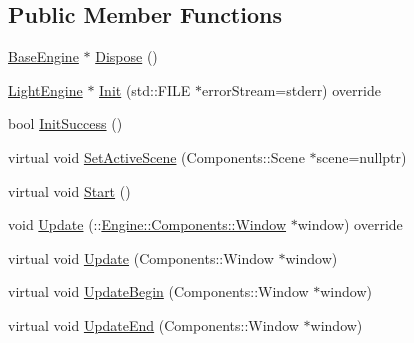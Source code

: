 \subsection*{Public Member Functions}
\begin{DoxyCompactItemize}
\item 
\mbox{\hyperlink{classEngine_1_1BaseEngine_ad838c97afe1790cb35527f0b58e81e6b}{Base\+Engine}} $\ast$ \mbox{\hyperlink{classEngine_1_1BaseEngine_acd5cd5d2189d24e038b23477b7dce405}{Dispose}} ()
\item 
\mbox{\hyperlink{classApplication_1_1Engines_1_1LightEngine}{Light\+Engine}} $\ast$ \mbox{\hyperlink{classApplication_1_1Engines_1_1LightEngine_ad992d8a300f099c247d7ba8dc38883ea}{Init}} (std\+::\+F\+I\+LE $\ast$error\+Stream=stderr) override
\item 
bool \mbox{\hyperlink{classEngine_1_1BaseEngine_a7a1c9b833049b3eb61194cab113dfe89}{Init\+Success}} ()
\item 
virtual void \mbox{\hyperlink{classEngine_1_1BaseEngine_afc82c6a00d5a9d4714740fc5eab5db86}{Set\+Active\+Scene}} (Components\+::\+Scene $\ast$scene=nullptr)
\item 
virtual void \mbox{\hyperlink{classEngine_1_1BaseEngine_a525fdc7a1da7eecb514ad5763f06be79}{Start}} ()
\item 
void \mbox{\hyperlink{classApplication_1_1Engines_1_1LightEngine_a18575df6f8742099ae543e3b23508ee9}{Update}} (\+::\mbox{\hyperlink{classEngine_1_1Components_1_1Window}{Engine\+::\+Components\+::\+Window}} $\ast$window) override
\item 
virtual void \mbox{\hyperlink{classEngine_1_1BaseEngine_a01c23c2073f08939a660f3b7a866852c}{Update}} (Components\+::\+Window $\ast$window)
\item 
virtual void \mbox{\hyperlink{classEngine_1_1BaseEngine_aace6be2a42d12b64fbd35f1acdb08408}{Update\+Begin}} (Components\+::\+Window $\ast$window)
\item 
virtual void \mbox{\hyperlink{classEngine_1_1BaseEngine_a7c07c98e583df042a0eb01e0ddec85a1}{Update\+End}} (Components\+::\+Window $\ast$window)
\end{DoxyCompactItemize}
